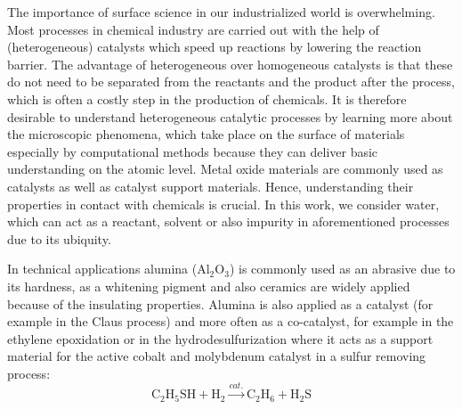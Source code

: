 \documentclass[11pt,DIV=13,BCOR=5mm,a4paper,headinclude]{scrbook}
\begin{document}
\renewcommand{\contentsname}{Contents}
\clearpage
\tableofcontents
\clearpage


The importance of surface science in our industrialized world is overwhelming.
Most processes in chemical industry are carried out with the help of (heterogeneous) catalysts\cite{Ago2005,Cargnello2012,Knozinger1978} which speed up reactions by lowering the reaction barrier.
The advantage of heterogeneous over homogeneous catalysts is that these do not need to be separated from the reactants and the product after the process, which is often a costly step in the production of chemicals.
It is therefore desirable to understand heterogeneous catalytic processes by learning more about the microscopic phenomena, which take place on the surface of materials especially by computational methods because they can deliver basic understanding on the atomic level.
Metal oxide materials are commonly used as catalysts as well as catalyst support materials.
Hence, understanding their properties in contact with chemicals is crucial.
In this work, we consider water, which can act as a reactant, solvent or also impurity in aforementioned processes due to its ubiquity.


In technical applications alumina (Al$_2$O$_3$) is commonly used as an abrasive due to its hardness, as a whitening pigment and also ceramics are widely applied because of the insulating properties.
Alumina is also applied as a catalyst (for example in the Claus process\cite{Pearson1977}) %
and more often as a co-catalyst, for example in the ethylene epoxidation\cite{Oezbek2013} or in the hydrodesulfurization\cite{Parijs1986} where it acts as a support material for the active cobalt and molybdenum catalyst in a sulfur removing process:
\begin{equation*}
 \textrm{C}_2\textrm{H}_5\textrm{SH} + \textrm{H}_2  \xrightarrow{cat.} \textrm{C}_2\textrm{H}_6 + \textrm{H}_2\textrm{S}
\end{equation*}
\end{document}
